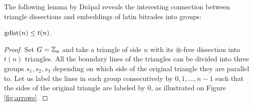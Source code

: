 The following lemma by Drápal \cite{Drapal91} reveals the interesting connection between triangle dissections and embeddings of latin bitrades into groups:

\begin{thm}
\label{thm:gdist-leq-tn}
$\mathop{\mathrm{gdist}}(n) \leq t(n)$.
\end{thm}
\begin{proof}
Set $G = \mathbb Z_n$ and take a triangle of side $n$ with its $\circledast$-free dissection into $t(n)$ triangles. All the boundary lines of the triangles can be divided into three groups $s_1,s_2,s_3$ depending on which side of the original triangle they are parallel to. Let us label the lines in each group consecutively by $0,1,\dots,n-1$ such that the sides of the original triangle are labeled by $0$, as illustrated on Figure \ref{fig:arrows}.


\end{proof}

